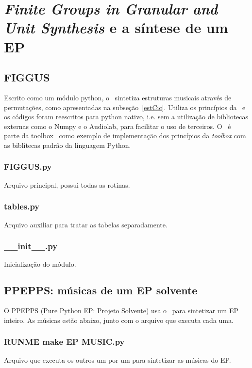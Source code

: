 \chapter{\emph{Finite Groups in Granular and Unit Synthesis} e a síntese de um EP}
\label{cap:FIGGUScode}
\section{FIGGUS}

Escrito como um módulo python, o \figgus\ sintetiza estruturas
musicais através de permutações, como apresentadas na subseção~\ref{estCic}. Utiliza os princípios da \massa\
e os códigos foram reescritos para python nativo, i.e. sem a 
utilização de bibliotecas externas como o Numpy e o Audiolab, para facilitar
o uso de terceiros. O \figgus\ é parte da toolbox \massa\ como exemplo de implementação dos princípios da \emph{toolbox} com as biblitecas padrão da linguagem Python.\cite{MASSA}


\subsection{FIGGUS.py}\label{ap:figgus.py}
Arquivo principal, possui todas as rotinas.


\subsection{tables.py}\label{ap:tables.py}
Arquivo auxiliar para tratar as tabelas separadamente.

\subsection{\_\_init\_\_.py}\label{ap:init.py}
Inicialização do módulo.


\section{PPEPPS: músicas de um EP solvente}
O PPEPPS (Pure Python EP: Projeto Solvente) usa
o \figgus\ para sintetizar um EP inteiro. As músicas
estão abaixo, junto com o arquivo que executa cada uma.

\subsection{RUNME make EP MUSIC.py}\label{ap:RUNME.py}
Arquivo que executa os outros um por um para sintetizar as músicas do EP.

